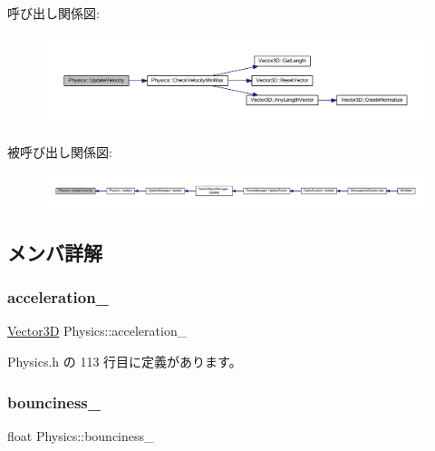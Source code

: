 呼び出し関係図\+:\nopagebreak
\begin{figure}[H]
\begin{center}
\leavevmode
\includegraphics[width=350pt]{class_physics_abd74d6413b1fd6c77007edf51ea9db4b_cgraph}
\end{center}
\end{figure}
被呼び出し関係図\+:
\nopagebreak
\begin{figure}[H]
\begin{center}
\leavevmode
\includegraphics[width=350pt]{class_physics_abd74d6413b1fd6c77007edf51ea9db4b_icgraph}
\end{center}
\end{figure}


\subsection{メンバ詳解}
\mbox{\label{class_physics_a8e87f3c364d5d0b8d3fb228237f3ff56}} 
\subsubsection{\texorpdfstring{acceleration\+\_\+}{acceleration\_}}
{\footnotesize\ttfamily \mbox{\hyperlink{class_vector3_d}{Vector3D}} Physics\+::acceleration\+\_\+\hspace{0.3cm}{\ttfamily [private]}}



 Physics.\+h の 113 行目に定義があります。

\mbox{\label{class_physics_a302b8ad7552303570fa1cfd070bb8588}} 
\subsubsection{\texorpdfstring{bounciness\+\_\+}{bounciness\_}}
{\footnotesize\ttfamily float Physics\+::bounciness\+\_\+\hspace{0.3cm}{\ttfamily [private]}}



